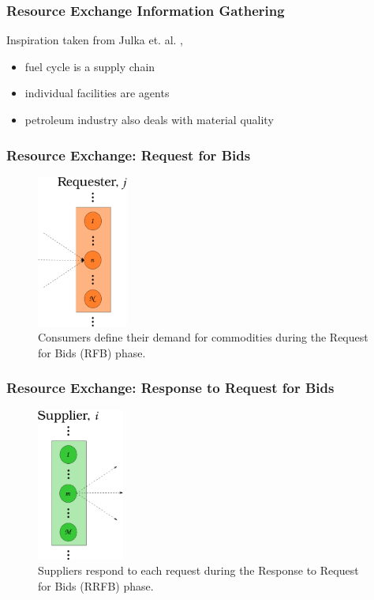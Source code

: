 \begin{frame}[ctb!]
  \frametitle{Resource Exchange Information Gathering}

  Inspiration taken from Julka et. al. \cite{julka_agent-based_2002},

  \begin{itemize}
    \item fuel cycle is a supply chain
    \item individual facilities are agents
    \item petroleum industry also deals with material quality
  \end{itemize}
  
\end{frame}

\begin{frame}[ctb!]
  \frametitle{Resource Exchange: Request for Bids}
  \begin{figure}
    \includegraphics[height=5cm]{./images/requester.eps}
    \caption{Consumers define their demand for commodities during the Request
      for Bids (RFB) phase.}
  \end{figure}
\end{frame}

\begin{frame}[ctb!]
  \frametitle{Resource Exchange: Response to Request for Bids}
  \begin{figure}
    \includegraphics[height=5cm]{./images/supplier.eps}
    \caption{Suppliers respond to each request during the Response to Request
      for Bids (RRFB) phase.}
  \end{figure}
\end{frame}

